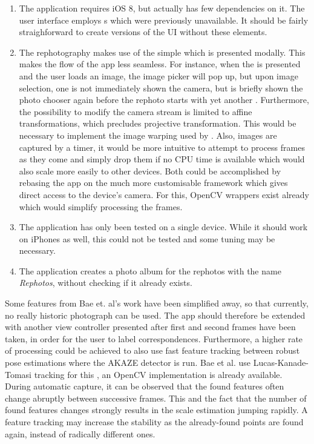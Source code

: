\begin{enumerate}
   \item The application requires iOS 8, but actually has few dependencies on
      it. The user interface employs s which were
      previously unavailable. It should be fairly straighforward to create
      versions of the UI without these elements.

   \item The rephotography makes use of the simple
       which is presented modally. This makes the
      flow of the app less seamless. For instance, when the
       is presented and the user loads an image,
      the image picker will pop up, but upon image selection, one is not
      immediately shown the camera, but is briefly shown the photo chooser again
      before the rephoto starts with yet another .
      Furthermore, the possibility to modify the camera stream is limited to
      affine transformations, which precludes projective transformation. This
      would be necessary to implement the image warping used by \citet{bae2010}.
      Also, images are captured by a timer, it would be more intuitive to
      attempt to process frames as they come and simply drop them if no CPU time
      is available which would also scale more easily to other devices. Both
      could be accomplished by rebasing the app on the much more customisable
       framework which gives direct access to the device's
      camera. For this, OpenCV wrappers exist already which would simplify
      processing the frames.  

   \item The application has only been tested on a single device. While it
      should work on iPhones as well, this could not be tested and some tuning
      may be necessary.

   \item The application creates a photo album for the rephotos with the name
      \emph{Rephotos}, without checking if it already exists.

\end{enumerate}

Some features from Bae et. al's work have been simplified away, so that
currently, no really historic photograph can be used. The app should therefore
be extended with another view controller presented after first and second frames
have been taken, in order for the user to label correspondences. Furthermore, a
higher rate of processing could be achieved to also use fast feature tracking
between robust pose estimations where the AKAZE detector is run. Bae et al. use
Lucas-Kanade-Tomasi tracking for this \citep{lucas1981,tomasi1991}, an OpenCV
implementation is already available. During automatic capture, it can be
observed that the found features often change abruptly between successive
frames. This and the fact that the number of found features changes strongly
results in the scale estimation jumping rapidly. A feature tracking may increase
the stability as the already-found points are found again, instead of radically
different ones.


